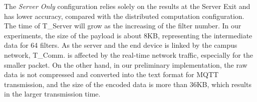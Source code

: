 \documentclass[conference]{IEEEtran}
\begin{document}
The \emph{Server Only} configuration relies solely on the results at the Server Exit and has lower accuracy, compared with the distributed computation configuration.
The time of T\_Server will grow as the increasing of the filter number. In our experiments, the size of the payload is about 8KB, representing the intermediate data for 64 filters. As the server and the end device is linked by the campus network, T\_Comm. is affected by the real-time network traffic, especially for the smaller packet. On the other hand, in our preliminary implementation, the raw data is not compressed and converted into the text format for MQTT transmission, and the size of the encoded data is more than 36KB, which results in the larger transmission time.
\end{document}
